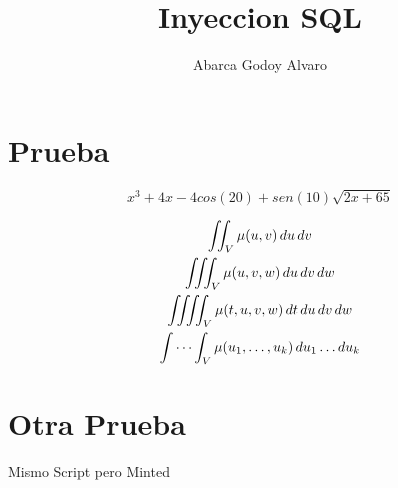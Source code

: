 
\usepackage{lipsum}

\title{Inyeccion SQL}
\author{Abarca Godoy Alvaro}
\def\grupo{4NV40}
\def\asignatura{Administracion de Bases de Datos}
\def\docente{Docente}
\def\fechaEntrega{Fecha de Entrega}






\tableofcontents

\newpage


  \section{Prueba}

   \[
     x^3 + 4x -4cos(20) + sen(10) \sqrt{2x+65}
   \] 



   \begin{gather*}
    \iint_V \mu(u,v) \,du\,dv
\\
    \iiint_V \mu(u,v,w) \,du\,dv\,dw
\\
    \iiiint_V \mu(t,u,v,w) \,dt\,du\,dv\,dw
\\
    \idotsint_V \mu(u_1,\dots,u_k) \,du_1 \dots du_k
\end{gather*}

   \section{Otra Prueba}

  \newpage
  Mismo Script pero Minted
   \inputminted[bgcolor=backcolour, fontsize=\scriptsize]{python}{/home/abargdev/Scripts/document.py}
 
